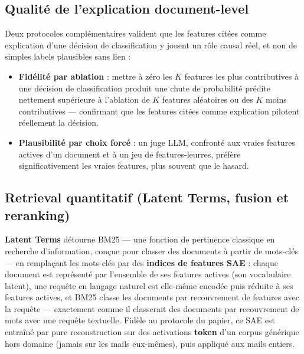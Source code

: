 \documentclass[11pt]{article}
\begin{document}
\subsection{Qualité de l'explication document-level}

Deux protocoles complémentaires valident que les features citées comme
explication d'une décision de classification y jouent un rôle causal réel,
et non de simples labels plausibles sans lien :

\begin{itemize}
  \item \textbf{Fidélité par ablation} : mettre à zéro les $K$ features les
    plus contributives à une décision de classification produit une chute de
    probabilité prédite nettement supérieure à l'ablation de $K$ features
    aléatoires ou des $K$ moins contributives --- confirmant que les features
    citées comme explication pilotent réellement la décision.
  \item \textbf{Plausibilité par choix forcé} : un juge LLM, confronté aux
    vraies features actives d'un document et à un jeu de features-leurres,
    préfère significativement les vraies features, plus souvent que le
    hasard.
\end{itemize}

\subsection{Retrieval quantitatif (Latent Terms, fusion et reranking)}

\textbf{Latent Terms} \cite{clavie2026latentterms} détourne BM25 --- une
fonction de pertinence classique en recherche d'information, conçue pour
classer des documents à partir de mots-clés --- en remplaçant les mots-clés
par des \textbf{indices de features SAE} : chaque document est représenté par
l'ensemble de ses features actives (son \og{}vocabulaire latent\fg{}), une
requête en langage naturel est elle-même encodée puis réduite à ses features
actives, et BM25 classe les documents par recouvrement de features avec la
requête --- exactement comme il classerait des documents par recouvrement de
mots avec une requête textuelle. Fidèle au protocole du papier, ce SAE est
entraîné par pure reconstruction sur des activations \textbf{token} d'un
corpus générique hors domaine (jamais sur les mails eux-mêmes), puis appliqué
aux mails entiers.
\end{document}
